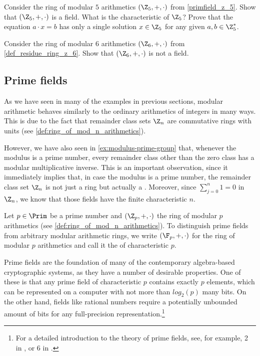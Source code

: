 \begin{exercise}
Consider the ring of modular $5$ arithmetics $(\Z_5,+,\cdot)$ from \examplename{} \ref{primfield_z_5}. Show that $(\Z_5,+,\cdot)$ is a field. What is the characteristic of $\Z_5$? Prove that the equation $a\cdot x = b$ has only a single solution $x\in \Z_5$  for any given $a,b\in \Z_5^*$. 
\end{exercise}
\begin{exercise}
Consider the ring of modular $6$ arithmetics $(\Z_6,+,\cdot)$ from \examplename{} \ref{def_residue_ring_z_6}. Show that $(\Z_6,+,\cdot)$ is not a field.
\end{exercise}

\subsection{Prime fields}
\label{prime_fields}
As we have seen in many of the examples in previous sections, modular arithmetic behaves similarly to the ordinary arithmetics of integers  in many ways. This is due to the fact that remainder class sets $\Z_n$ are commutative rings with units (see \examplename{} \ref{def:ring_of_mod_n_arithmetics}).

However, we have also seen in \examplename{} \ref{ex:modulus-prime-group} that, whenever the modulus is a prime number, every remainder class other than the zero class has a modular multiplicative inverse. This is an important observation, since it immediately implies that, in case the modulus is a prime number, the remainder class set $\Z_n$ is not just a ring but actually a . Moreover, since $\sum_{j=0}^n 1 = 0$ in $\Z_n$, we know that those fields have the finite characteristic $n$.

\begin{notation}
\label{def:prime_fields}
Let $p \in \Prim$ be a prime number and $(\Z_p,+,\cdot)$ the ring of modular $p$ arithmetics (see \examplename{} \ref{def:ring_of_mod_n_arithmetics}). To distinguish prime fields from arbitrary modular arithmetic rings, we write  $ (\F_p, +, \cdot) $ for the ring of modular $p$ arithmetics and call it the  of characteristic $p$.
\end{notation}

Prime fields are the foundation of many of the contemporary algebra-based cryptographic systems, as they have a number of desirable properties. One of these is that any prime field of characteristic $p$ contains exactly $p$ elements, which can be represented on a computer with not more than $log_2(p)$ many bits. On the other hand, fields like rational numbers require a potentially unbounded amount of bits for any full-precision representation.\footnote{For a detailed introduction to the theory of prime fields, see, for example, \chaptname{} 2 in \cite{nieder-1986}, or \chaptname{} 6 in \cite{mignotte-1992}.}

